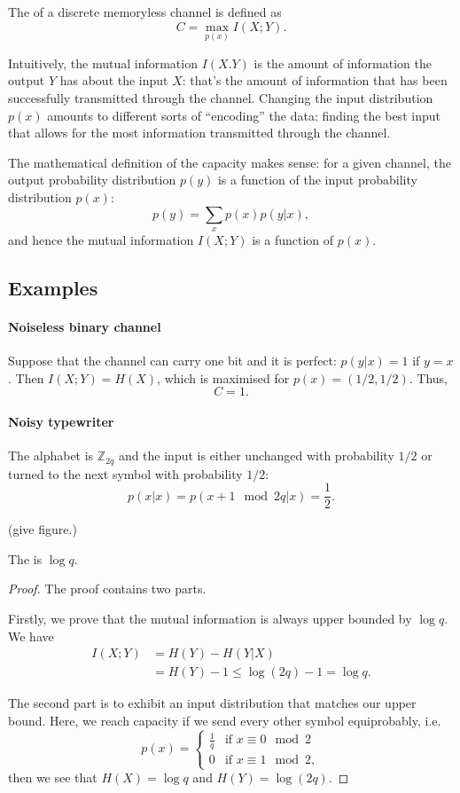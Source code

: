 The  of a discrete memoryless channel is defined as
\[
	C = \max_{p(x)} I(X;Y).
\]

Intuitively, the mutual information $I(X.Y)$ is the amount of information the output $Y$ has about the input $X$: that's the amount of information that has been successfully transmitted through the channel. Changing the input distribution $p(x)$ amounts to different sorts of ``encoding'' the data: finding the best input that allows for the most information transmitted through the channel.

The mathematical definition of the capacity makes sense: for a given channel, the output probability distribution $p(y)$ is a function of the input probability distribution $p(x)$:
\[
    p(y) = \sum_x p(x) p(y | x),
\]
and hence the mutual information $I(X;Y)$ is a function of $p(x)$.

\subsection{Examples}

\paragraph{Noiseless binary channel}
Suppose that the channel can carry one bit and it is perfect: $p(y|x) = 1$ if $y=x$. Then $I(X;Y) = H(X)$, which is maximised for $p(x) = (1/2, 1/2)$. 
Thus,
$$
	C = 1.
$$ 



\paragraph{Noisy typewriter}
The alphabet is $\mathbb{Z}_{2q}$ and the input is either unchanged with probability $1/2$ or turned to the next symbol with probability $1/2$:
$$
	p(x|x) = p(x+1 \mod 2q | x) = \frac{1}{2}.
$$

(give figure.)

\begin{theorem}
The  is $\log q$.
\end{theorem}

\begin{proof}
The proof contains two parts. 

Firstly, we prove that the mutual information is always upper bounded by $\log q$. We have
\begin{align*}
	I(X;Y) &= H(Y) - H(Y|X)\\
	&= H(Y) - 1 \le \log (2q) - 1 = \log q.
\end{align*}

The second part is to exhibit an input distribution that matches our upper bound. Here, we reach capacity if we send every other symbol equiprobably, i.e. 
\[
	p(x) = \begin{cases}
	\frac{1}{q} & \text{if } x \equiv 0 \mod 2\\
	0 & \text{if } x \equiv 1 \mod 2,
	\end{cases}
\]
then we see that $H(X) = \log q$ and $H(Y) = \log(2q)$.
\end{proof}



